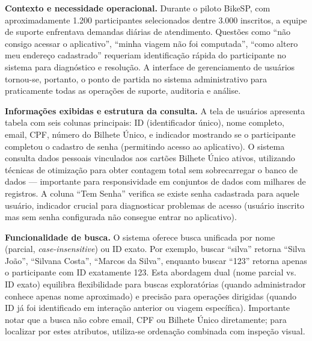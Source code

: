 

\textbf{Contexto e necessidade operacional.} Durante o piloto BikeSP, com
aproximadamente 1.200 participantes selecionados dentre 3.000 inscritos, a equipe de
suporte enfrentava demandas diárias de atendimento. Questões como ``não consigo acessar o aplicativo'', ``minha viagem não foi
computada'', ``como altero meu endereço cadastrado'' requeriam identificação rápida
do participante no sistema para diagnóstico e resolução. A interface de gerenciamento
de usuários tornou-se, portanto, o
ponto de partida no sistema administrativo  para praticamente todas as operações de suporte,
auditoria e análise.

\textbf{Informações exibidas e estrutura da consulta.} A tela de usuários apresenta
tabela com seis colunas principais: ID (identificador único), nome
completo, email, CPF, número do Bilhete Único, e indicador mostrando se o participante
completou o cadastro de senha (permitindo acesso ao aplicativo). O sistema consulta dados pessoais vinculados aos cartões Bilhete Único ativos, utilizando técnicas de otimização para obter contagem total sem sobrecarregar o banco de dados --- importante para responsividade em conjuntos de dados com milhares de registros. A coluna ``Tem Senha'' verifica se existe senha cadastrada para aquele usuário, indicador crucial para diagnosticar
problemas de acesso (usuário inscrito mas sem senha configurada não consegue entrar no aplicativo).

\textbf{Funcionalidade de busca.} O sistema oferece busca unificada por nome
(parcial, \textit{case-insensitive}\@) ou ID exato.
Por exemplo, buscar ``silva'' retorna ``Silva João'', ``Silvana Costa'', ``Marcos da
Silva'', enquanto buscar ``123'' retorna apenas o participante com ID exatamente 123.
Esta abordagem dual (nome parcial vs. ID exato) equilibra flexibilidade para buscas
exploratórias (quando administrador conhece apenas nome aproximado) e precisão para
operações dirigidas (quando ID já foi identificado em interação anterior ou viagem
específica). Importante notar que a busca não cobre email, CPF ou Bilhete
Único diretamente; para localizar por estes atributos, utiliza-se ordenação combinada com inspeção visual.


